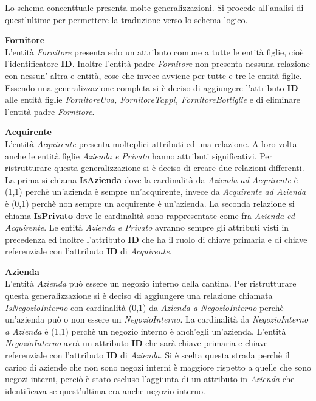 Lo schema concenttuale presenta molte generalizzazioni. Si procede all'analisi di quest'ultime per permettere la traduzione verso lo schema logico.\\

\begin{flushleft}
\textbf{\large{Fornitore}}\\
L'entità \emph{Fornitore} presenta solo un attributo comune a tutte le entità figlie, cioè l'identificatore \textbf{ID}. Inoltre l'entità padre \emph{Fornitore} non presenta nessuna relazione con nessun' altra e entità, cose che invece avviene per tutte e tre le entità figlie. Essendo una generalizzazione completa si è deciso di aggiungere l'attributo \textbf{ID} alle entità figlie \emph{FornitoreUva, FornitoreTappi, FornitoreBottiglie} e di eliminare l'entità padre \emph{Fornitore}. 
\end{flushleft}


\begin{flushleft}
	\textbf{\large{Acquirente}}\\
	L'entità \emph{Acquirente} presenta molteplici attributi ed una relazione. A loro volta anche le entità figlie \emph{Azienda e Privato} hanno attributi significativi. Per ristrutturare questa generalizzazione si è deciso di creare due relazioni differenti. La prima si chiama \textbf{IsAzienda} dove la cardinalità da \emph{Azienda ad Acquirente} è (1,1) perchè un'azienda è sempre un'acquirente, invece da \emph{Acquirente ad Azienda} è (0,1) perchè non sempre un acquirente è un'azienda.
	La seconda relazione si chiama \textbf{IsPrivato} dove le cardinalità sono rappresentate come fra \emph{Azienda ed Acquirente}. Le entità \emph{Azienda e Privato} avranno sempre gli attributi visti in precedenza ed inoltre l'attributo \textbf{ID} che ha il ruolo di chiave primaria e di chiave referenziale con l'attributo \textbf{ID} di \emph{Acquirente}. 
\end{flushleft}

\begin{flushleft}
	\textbf{\large{Azienda}}\\
	L'entità \emph{Azienda} può essere un negozio interno della cantina. Per ristrutturare questa generalizzazione si è deciso di aggiungere una relazione chiamata \emph{IsNegozioInterno} con cardinalità (0,1) da \emph{Azienda a NegozioInterno} perchè un'azienda può o non essere un \emph{NegozioInterno}. La cardinalità da \emph{NegozioInterno a Azienda} è (1,1) perchè un negozio interno è anch'egli un'azienda. L'entità \emph{NegozioInterno} avrà un attributo \textbf{ID} che sarà chiave primaria e chiave referenziale con l'attributo \textbf{ID} di \emph{Azienda}. Si è scelta questa strada perchè il carico di aziende che non sono negozi interni è maggiore rispetto a quelle che sono negozi interni, perciò è stato escluso l'aggiunta di un attributo in \emph{Azienda} che identificava se quest'ultima era anche negozio interno.
\end{flushleft}

